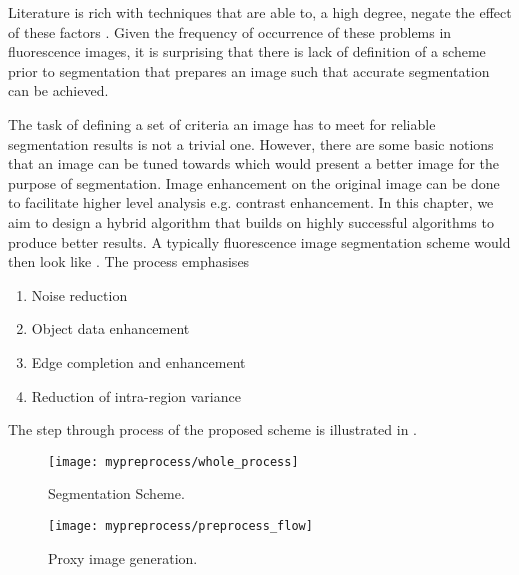 Literature is rich with techniques that are able to, a high degree, negate the effect of these factors \cite{Lysaker2004,Wang2008,Zhou2013}. Given the frequency of occurrence of these problems in fluorescence images, it is surprising that there is lack of definition of a scheme prior to segmentation that prepares an image such that accurate segmentation can be achieved.

The task of defining a set of criteria an image has to meet for reliable segmentation results is not a trivial one. However, there are some basic notions that an image can be tuned towards which would present a better image for the purpose of segmentation.
Image enhancement on the original image can be done to facilitate higher level analysis e.g. contrast enhancement.
In this chapter, we aim to design a hybrid algorithm that builds on highly successful algorithms to produce better results. A typically fluorescence image segmentation scheme would then look like . The process emphasises

\begin{enumerate}
	\item Noise reduction
	\item Object data enhancement
	\item Edge completion and enhancement
	\item Reduction of intra-region variance
\end{enumerate}

The step through process of the proposed scheme is illustrated in .

\begin{figure}[!h]
	\centering
	\texttt{[image: mypreprocess/whole\_process]}
	\caption{Segmentation Scheme.}
	\label{fig:wholescheme}
\end{figure}

\begin{figure}[!h]
	\centering
	\texttt{[image: mypreprocess/preprocess\_flow]}
	\caption{Proxy image generation.}
	\label{fig:flowchartproposedscheme}
\end{figure}


